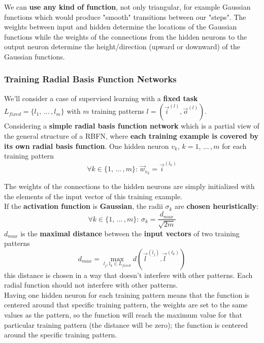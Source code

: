 \documentclass[11pt]{article}
\begin{document}
		We can \textbf{use any kind of function}, not only triangular, for example Gaussian functions which would produce "smooth" transitions between our "steps". The weights between input and hidden determine the locations of the Gaussian functions while the weights of the connections from the hidden neurons to the output neuron determine the height/direction (upward or downward) of the Gaussian functions.
		
		
		\newpage
		
		\subsubsection{Training Radial Basis Function Networks}
		We'll consider a case of supervised learning with a \textbf{fixed task} $L_{fixed} = \{l_1, \, ... \, , l_m\}$ with $m$ training patterns $l = \left(\vec{i}^{(l)}, \vec{o}^{(l)}\right)$.\\
		
		Considering a \textbf{simple radial basis function network} which is a partial view of the general structure of a RBFN, where \textbf{each training example is covered by its own radial basis function}. One hidden neuron $v_k$, $k = 1, \, ... \, , m$ for each training pattern
		$$ \forall k \in \{1, \, ... \, , m\}: \, \vec{w}_{v_k} = \vec{i}^{(l_k)} $$
		
		The weights of the connections to the hidden neurons are simply initialized with the elements of the input vector of this training example.\\
		
		If the \textbf{activation function} is \textbf{Gaussian}, the radii $\sigma_k$ are \textbf{chosen heuristically}:
		$$ \forall k \in \{1, \, ... \, , m\}: \, \sigma_k = \frac{d_{max}}{\sqrt{2m}} $$
		$d_{max}$ is the \textbf{maximal distance} between the \textbf{input vectors} of two training patterns
		$$ d_{max} = \max_{l_j, l_k \in L_{fixed}} d\left(\vec{l}^{(l_j)}. \vec{l}^{(l_k)}\right)$$
		this distance is chosen in a way that doesn't interfere with other patterns. Each radial function should not interfere with other patterns.\\
		
		Having one hidden neuron for each training pattern means that the function is centered around that specific training pattern, the weights are set to the same values as the pattern, so the function will reach the maximum value for that particular training pattern (the distance will be zero); the function is centered around the specific training pattern. \\
		
\end{document}
